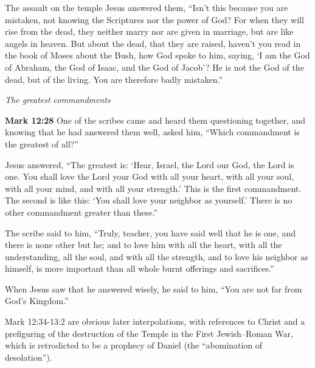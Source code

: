 \documentclass[10pt,twoside]{article} %
\newcommand{\quotesize}{\normalsize{}}
\newcommand{\comm}[1]{\begingroup \color{black!50} #1\endgroup}
\newenvironment{quotetext}{\begingroup\quotesize}{\endgroup}
\newcommand{\bible}[2]{\begin{quotetext}\textbf{#1} #2\end{quotetext}}
\newcommand{\gospelmark}[2]{\bible{Mark #1}{#2}}
\newcommand{\subhead}[1]{\emph{#1}\par}
\begin{document}
\begin{section}{The assault on the temple}
{  Jesus answered them, ``Isn't this because you are mistaken, not knowing the Scriptures nor the power of God?    For when they will rise from the dead, they neither marry nor are given in marriage, but are like angels in heaven.    But about the dead, that they are raised, haven't you read in the book of Moses about the Bush, how God spoke to him, saying, `I am the God of Abraham, the God of Isaac, and the God of Jacob'?    He is not the God of the dead, but of the living. You are therefore badly mistaken.'' 
}

\subhead{The greatest commandments}\label{greatest-commandments}

\gospelmark{12:28}{
One of the scribes came and heard them questioning together, and knowing that he had answered them well, asked him, ``Which commandment is the greatest of all?''

  Jesus answered, ``The greatest is: `Hear, Israel, the Lord our God, the Lord is one.    You shall love the Lord your God with all your heart, with all your soul, with all your mind, and with all your strength.' This is the first commandment.    The second is like this: `You shall love your neighbor as yourself.' There is no other commandment greater than these.''

  The scribe said to him, ``Truly, teacher, you have said well that he is one, and there is none other but he;   and to love him with all the heart, with all the understanding, all the soul, and with all the strength, and to love his neighbor as himself, is more important than all whole burnt offerings and sacrifices.''

  When Jesus saw that he answered wisely, he said to him, ``You are not far from God's Kingdom.'' 
}

\comm{Mark 12:34-13:2 are obvious later interpolations, with references to Christ and a prefiguring of the destruction of the
Temple in the First Jewish–Roman War, which is retrodicted to be a prophecy of Daniel (the ``abomination of desolation'').}

\end{section}
\end{document}
